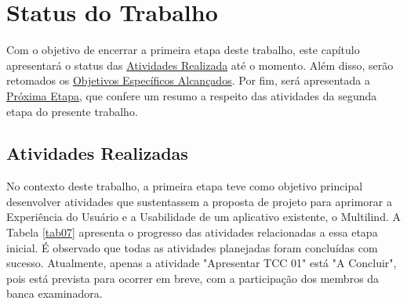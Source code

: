 \chapter[Status do Trabalho]{Status do Trabalho}
\label{chap:Status}
Com o objetivo de encerrar a primeira etapa deste trabalho, este capítulo apresentará o status das \hyperref[sec:Atividades Realizadas]{Atividades
Realizada} até o momento. Além disso, serão retomados os \hyperref[sec:Objetivos Especificos Alcancados]{Objetivos Específicos Alcançados}. 
Por fim, será apresentada a \hyperref[sec:Proxima Etapa]{Próxima Etapa}, que confere um resumo a respeito das atividades da segunda etapa do presente trabalho.

\section{Atividades Realizadas}
\label{sec:Atividades Realizadas}
No contexto deste trabalho, a primeira etapa teve como objetivo principal desenvolver atividades que sustentassem a proposta 
de projeto para aprimorar a Experiência do Usuário e a Usabilidade de um aplicativo existente, o Multilind. A Tabela \ref{tab07} apresenta 
o progresso das atividades relacionadas a essa etapa inicial. É observado que todas as atividades planejadas foram concluídas com sucesso. 
Atualmente, apenas a atividade "Apresentar TCC 01" está "A Concluir", pois está prevista para ocorrer em breve, com a participação dos membros da banca 
examinadora.

